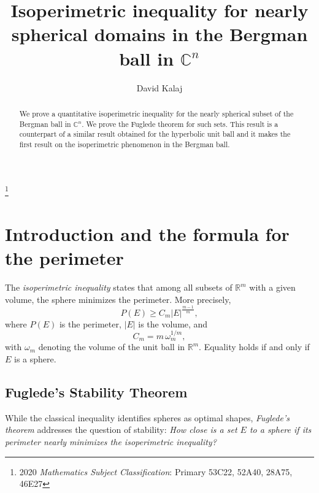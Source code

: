 \documentclass[11pt]{amsart}
\numberwithin{equation}{section}
\begin{document}
\title[Isoperimetric inequality for nearly spherical domains in the Bergman ball]{Isoperimetric inequality for nearly spherical domains in the Bergman ball in $\mathbb{C}^n$}




\author{David Kalaj}
\address{University of Montenegro, Faculty of Natural Sciences and
Mathematics, Cetinjski put b.b. 81000 Podgorica, Montenegro}

\footnote{2020 \emph{Mathematics Subject Classification}: Primary 53C22, 52A40, 28A75, 46E27}


\begin{abstract}
 We prove a quantitative isoperimetric inequality for the nearly spherical subset of the Bergman ball in $\mathbb{C}^n$. We prove the Fuglede theorem for such sets. This result is a counterpart of a similar result obtained for the hyperbolic unit ball and it makes the first result on the isoperimetric phenomenon in the Bergman ball.
\end{abstract}
\maketitle
\tableofcontents
\sloppy

\maketitle
\section{Introduction and the formula for the perimeter}

The \textit{isoperimetric inequality} states that among all subsets of \( \mathbb{R}^m \) with a given volume, the sphere minimizes the perimeter. More precisely,
\[
P(E) \geq C_m |E|^{\frac{m-1}{m}},
\]
where \( P(E) \) is the perimeter, \( |E| \) is the volume, and
\[
C_m = m \, \omega_m^{1/m},
\]
with $\omega_m$ denoting the volume of the unit ball in $\mathbb{R}^m$. Equality holds if and only if \( E \) is a sphere.

\subsection*{Fuglede's Stability Theorem}\cite{fug}
While the classical inequality identifies spheres as optimal shapes, \textit{Fuglede's theorem} addresses the question of stability:
\textit{How close is a set \( E \) to a sphere if its perimeter nearly minimizes the isoperimetric inequality?}
\end{document}
